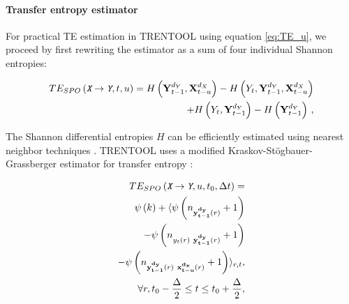 \documentclass[a4paper,10pt]{article}
\begin{document}
\paragraph*{Transfer entropy estimator} For practical TE estimation in TRENTOOL using equation \ref{eq:TE_u}, we proceed by first rewriting the estimator as a sum of four individual Shannon entropies:

\begin{equation}
\label{eq:TE_shannon}
\begin{split}
TE_{SPO}\left(\textit{\texttt{X}}\rightarrow \textit{\texttt{Y}},t,u\right) = H\left(\mathbf{Y}^{d_{Y}}_{t-1}, \mathbf{X}^{d_{X}}_{t-u}  \right) - H\left(Y_{t}, \mathbf{Y}^{d_{Y}}_{t-1}, \mathbf{X}^{d_{X}}_{t-u}  \right)\\
 + H\left( Y_{t}, \mathbf{Y}^{d_{Y}}_{t-1} \right) - H \left( \mathbf{Y}^{d_{Y}}_{t-1} \right) \,,
\end{split}
\end{equation}

The Shannon differential entropies $H$ can be efficiently estimated using nearest neighbor techniques \cite{kozachenko1987,victor2002}. TRENTOOL uses a modified Kraskov-St\"{o}gbauer-Grassberger estimator for transfer entropy \cite{kraskov2004}:

\begin{equation}
\label{eq:TE_kras}
\begin{split}
TE_{SPO}\left(\textit{\texttt{X}}\rightarrow \textit{\texttt{Y}},u,t_0,\Delta t\right) = \\ \psi\left(k\right)
  +\langle 
    \psi  \left( n_{\mathbf{y_{t-1}^{d_{y}}}(r)} +1 \right)\\
    -\psi \left( n_{y_t(r)\   \mathbf{y_{t-1}^{d_y}}(r)} +1 \right)\\
    -\psi \left( n_{\mathbf{y_{t-1}^{d_y}}(r)\   \mathbf{x_{t-u}^{d_x}}(r)} +1 \right) 
  \rangle_{r,t}, \\
  \forall r, t_0-\frac{\Delta}{2} \leq t \leq t_0 + \frac{\Delta}{2},
\end{split}
\end{equation}

\end{document}
